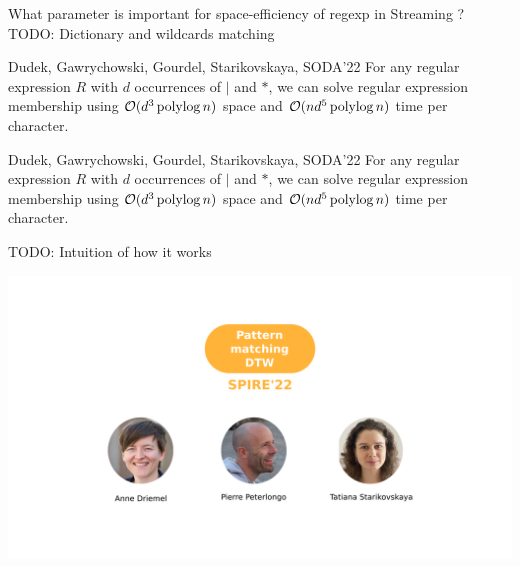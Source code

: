\begin{frame}{What parameter is important for space-efficiency of regexp in Streaming ?}
    TODO: Dictionary and wildcards matching 

    \begin{myalertblock}{Dudek, Gawrychowski, Gourdel, Starikovskaya, SODA'22}
        For any regular expression $R$ with $d$ occurrences of $|$ and $\ast$, we can solve regular expression membership using $\mathcal{O}(d^{3}\operatorname{polylog} n)$ space and $\mathcal{O}(nd^{5}\operatorname{polylog} n)$ time per character.
    \end{myalertblock}
\end{frame}

\begin{frame}{}

    \begin{myalertblock}{Dudek, Gawrychowski, Gourdel, Starikovskaya, SODA'22}
        For any regular expression $R$ with $d$ occurrences of $|$ and $\ast$, we can solve regular expression membership using $\mathcal{O}(d^{3}\operatorname{polylog} n)$ space and $\mathcal{O}(nd^{5}\operatorname{polylog} n)$ time per character.
    \end{myalertblock}
    TODO: Intuition of how it works  
\end{frame}

\begin{frame}
    \includegraphics[width=\textwidth]{pictures/mindmap/dtw.png}
\end{frame}


\newcommand{\dtw}{\mathrm{DTW}}
\newcommand{\ed}{\mathrm{ED}}
\newcommand{\RLE}{\mathrm{RLE}}

